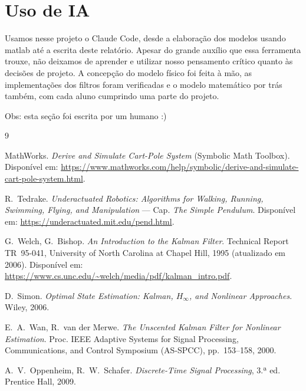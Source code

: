 \documentclass[brazil, 12pt]{article}
\begin{document}
\section{Uso de IA}

Usamos nesse projeto o Claude Code, desde a elaboração dos modelos usando matlab até a escrita deste relatório.
Apesar do grande auxílio que essa ferramenta trouxe, não deixamos de aprender e utilizar nosso pensamento crítico quanto às decisões de projeto. A concepção do modelo físico foi feita à mão, as implementações dos filtros foram verificadas e o modelo matemático por trás também, com cada aluno cumprindo uma parte do projeto. 

Obs: esta seção foi escrita por um humano :)
\begin{thebibliography}{9}

MathWorks. \emph{Derive and Simulate Cart-Pole System} (Symbolic Math Toolbox).
Disponível em:
\url{https://www.mathworks.com/help/symbolic/derive-and-simulate-cart-pole-system.html}.

R.~Tedrake. \emph{Underactuated Robotics: Algorithms for Walking, Running,
Swimming, Flying, and Manipulation} --- Cap. \emph{The Simple Pendulum}.
Disponível em: \url{https://underactuated.mit.edu/pend.html}.

G.~Welch, G.~Bishop. \emph{An Introduction to the Kalman Filter}. Technical
Report TR~95-041, University of North Carolina at Chapel Hill, 1995
(atualizado em 2006). Disponível em:
\url{https://www.cs.unc.edu/~welch/media/pdf/kalman_intro.pdf}.

D.~Simon. \emph{Optimal State Estimation: Kalman, $H_\infty$, and Nonlinear
Approaches}. Wiley, 2006.

E.~A.~Wan, R.~van der Merwe. \emph{The Unscented Kalman Filter for Nonlinear
Estimation}. Proc. IEEE Adaptive Systems for Signal Processing, Communications,
and Control Symposium (AS-SPCC), pp.~153--158, 2000.

A.~V.~Oppenheim, R.~W.~Schafer. \emph{Discrete-Time Signal Processing}, 3.ª
ed. Prentice Hall, 2009.

\end{thebibliography}
\end{document}
